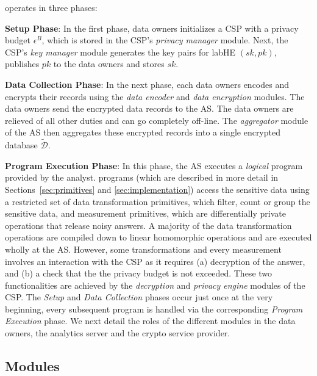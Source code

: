 \system operates in three phases: 
 \squishlist
 \item \textbf{Setup Phase}: In the first phase, data owners initializes a \textsf{CSP} with a privacy budget $\epsilon^B$, which is stored in the \textsf{CSP}'s \textit{privacy manager} module. Next, the  \textsf{CSP}'s \textit{key manager} module generates the key pairs for labHE $(sk,pk)$, publishes $pk$ to the data owners and stores $sk$. 
 \item \textbf{Data Collection Phase}: In the next phase, each data owners encodes and encrypts their records using the \textit{data encoder} and \textit{data encryption} modules. The data owners send the encrypted data records to the \textsf{AS}. The data owners are relieved of all other duties and can go completely off-line. The \textit{aggregator} module of the \textsf{AS} then aggregates these encrypted records into a single encrypted database $\boldsymbol{\tilde{\mathcal{D}}}$. 
 \item \textbf{Program Execution Phase}: In this phase, the \textsf{AS} executes a \textit{logical} \system program provided by the analyst. \system programs (which are described in more detail in Sections~\ref{sec:primitives} and \ref{sec:implementation}) access the sensitive data using a restricted set of data transformation primitives, which filter, count or group the sensitive data, and measurement primitives, which are differentially private operations that release noisy answers. A majority of the data transformation operations are compiled down to linear homomorphic operations and are executed wholly at the \textsf{AS}. However, some transformations and every measurement involves an interaction with the \textsf{CSP} as it requires (a) decryption of the answer, and (b) a check that the the privacy budget is not exceeded. These two functionalities are achieved by the \textit{decryption} and \textit{privacy engine} modules of the \textsf{CSP}. 
 \squishend
 The \emph{Setup} and \emph{Data Collection} phases occur just once at the very beginning, every subsequent program  is handled via the corresponding  \emph{Program Execution} phase. We next detail the roles of the different modules in the data owners, the analytics server and the crypto service provider.  
 
\subsection{\system Modules}\label{sec:modules}

